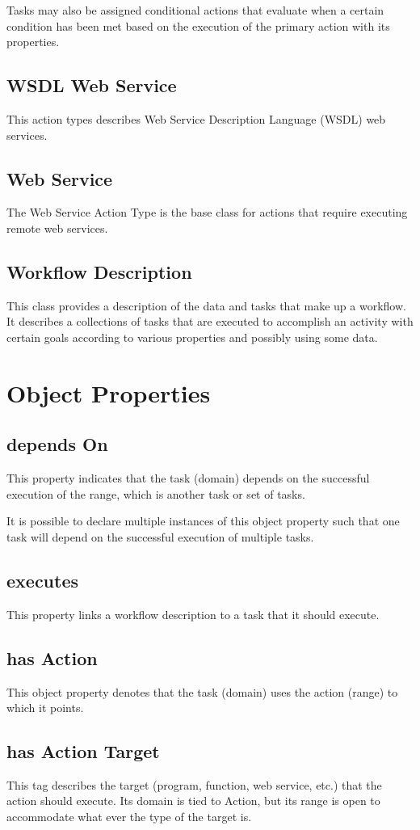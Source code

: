 Tasks may also be assigned conditional actions that evaluate when a certain condition has been met based on the execution of the primary action with its properties.
			\subsection{
			WSDL Web Service
			}
			This action types describes Web Service Description Language (WSDL) web services.
			\subsection{
			Web Service
			}
			The Web Service Action Type is the base class for actions that require executing remote web services.
			\subsection{
			Workflow Description
			}
			This class provides a description of the data and tasks that make up a workflow. It describes a collections of tasks that are executed to accomplish an activity with certain goals according to various properties and possibly using some data.
\section{Object Properties}
			\subsection{
			depends On
			}
			This property indicates that the task (domain) depends on the successful execution of the range, which is another task or set of tasks.

It is possible to declare multiple instances of this object property such that one task will depend on the successful execution of multiple tasks.
			\subsection{
			executes
			}
			This property links a workflow description to a task that it should execute.
			\subsection{
			has Action
			}
			This object property denotes that the task (domain) uses the action (range) to which it points.
			\subsection{
			has Action Target
			}
			This tag describes the target (program, function, web service, etc.) that the action should execute. Its domain is tied to Action, but its range is open to accommodate what ever the type of the target is.
